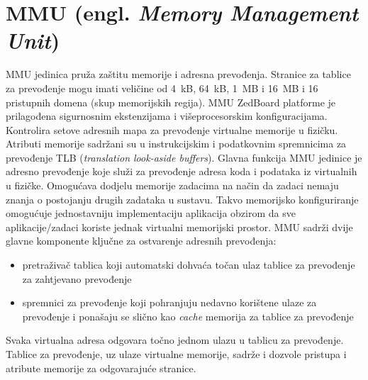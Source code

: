 \documentclass[times, utf8, diplomski, numeric]{fer}
\begin{document}
\section{MMU (engl. \textit{Memory Management Unit})}
MMU jedinica pruža zaštitu memorije i adresna prevođenja. Stranice za tablice za prevođenje mogu imati veličine od 4~kB,
64~kB, 1~MB i 16~MB i 16 pristupnih domena (skup memorijskih regija). MMU ZedBoard platforme je prilagođena sigurnosnim
ekstenzijama i višeprocesorskim konfiguracijama. Kontrolira setove adresnih mapa za prevođenje virtualne memorije u fizičku.
Atributi memorije sadržani su u instrukcijskim i podatkovnim spremnicima za prevođenje TLB (\textit{translation look-aside
buffers}). Glavna funkcija MMU jedinice je adresno prevođenje koje služi za prevođenje adresa koda i podataka iz virtualnih u
fizičke. Omogućava dodjelu memorije zadacima na način da zadaci nemaju znanja o postojanju drugih zadataka u sustavu. Takvo
memorijsko konfiguriranje omogućuje jednostavniju implementaciju aplikacija obzirom da sve aplikacije/zadaci koriste jednak
virtualni memorijski prostor. MMU sadrži dvije glavne komponente ključne za ostvarenje adresnih prevođenja:
\begin{itemize}
  \item{pretraživač tablica koji automatski dohvaća točan ulaz tablice za prevođenje za zahtjevano prevođenje}
  \item{spremnici za prevođenje koji pohranjuju nedavno korištene ulaze za prevođenje i ponašaju se slično kao \textit{cache}
  memorija za tablice za prevođenje}
\end{itemize}
Svaka virtualna adresa odgovara točno jednom ulazu u tablicu za prevođenje. Tablice za prevođenje, uz ulaze virtualne memorije,
sadrže i dozvole pristupa i atribute memorije za odgovarajuće stranice.
\end{document}

